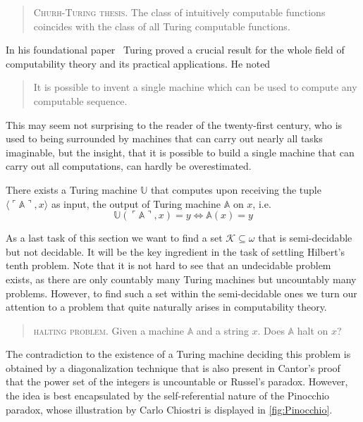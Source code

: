\begin{quote}
  \textsc{Churh-Turing thesis.} The class of intuitively computable
  functions coincides with the class of all Turing computable functions.
\end{quote}

In his foundational paper~\cite{Turing1936} Turing proved a crucial result for
the whole field of computability theory and its practical applications. He noted
\begin{quote}
  It is possible to invent a single machine which can be used to compute any
  computable sequence.
\end{quote}
This may seem not surprising to the reader of the twenty-first century, who is
used to being surrounded by machines that can carry out nearly all tasks
imaginable, but the insight, that it is possible to build a single machine that
can carry out all computations, can hardly be overestimated.

\begin{thm}
    There exists a Turing machine \(\mathbb U\) that computes upon receiving
    the tuple \(⟨\ulcorner \mathbb A \urcorner, x⟩\) as input, the output of
    Turing machine \(\mathbb A\) on \(x\), i.e.
    \[
      \mathbb U(\ulcorner \mathbb A \urcorner, x) = y \Leftrightarrow
        \mathbb A (x) = y
    \]
\end{thm}

As a last task of this section we want to find a set \(\mathcal{K} \subseteq ω\)
that is semi-decidable but not decidable. It will be the key ingredient in the
task of settling Hilbert's tenth problem. Note that it is not hard to see that
an undecidable problem exists, as there are only countably many Turing machines
but uncountably many problems. However, to find such a set within the
semi-decidable ones we turn our attention to a problem that quite naturally
arises in computability theory.
\begin{quote}
  \textsc{halting problem.} Given a machine \(\mathbb A\) and a string \(x\).
  Does \(\mathbb A\) halt on \(x\)?
\end{quote}
The contradiction to the existence of a Turing machine deciding this problem is
obtained by a diagonalization technique that is also present in Cantor's proof
that the power set of the integers is uncountable or Russel's paradox. However,
the idea is best encapsulated by the self-referential nature of the Pinocchio
paradox, whose illustration by Carlo Chiostri is displayed in
\cref{fig:Pinocchio}.


